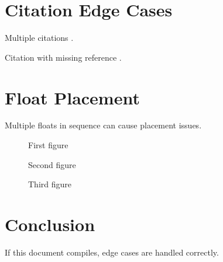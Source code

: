 \documentclass[11pt]{article}
\begin{document}
\section{Citation Edge Cases}

Multiple citations \cite{butterick2019practical,brown2018flexible,hochuli1987detail}.

Citation with missing reference \cite{nonexistent2023}.

\section{Float Placement}

Multiple floats in sequence can cause placement issues.

\begin{figure}[tbp]
  \centering
  \fbox{\rule{0pt}{1cm}\rule{0.5\textwidth}{0pt}}
  \caption{First figure}
\end{figure}

\begin{figure}[tbp]
  \centering
  \fbox{\rule{0pt}{1cm}\rule{0.5\textwidth}{0pt}}
  \caption{Second figure}
\end{figure}

\begin{figure}[tbp]
  \centering
  \fbox{\rule{0pt}{1cm}\rule{0.5\textwidth}{0pt}}
  \caption{Third figure}
\end{figure}

\FloatBarrier

\section{Conclusion}

If this document compiles, edge cases are handled correctly.

\printbibliography
\end{document}
